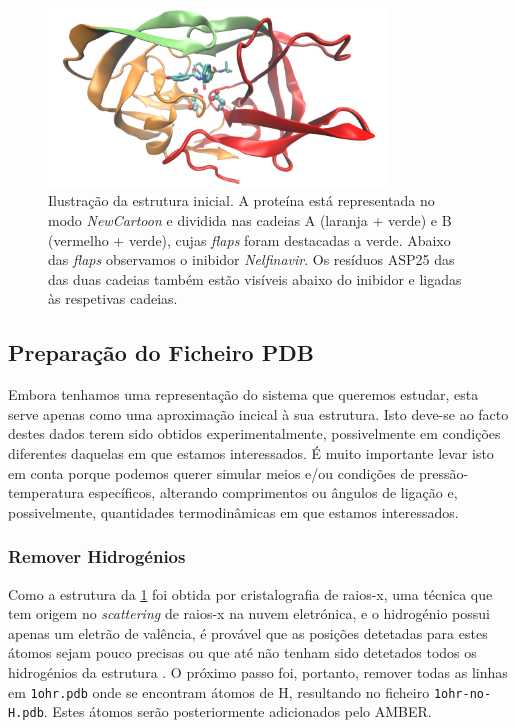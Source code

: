 \documentclass[12pt,a4paper]{article}
\begin{document}
	\begin{figure}[h]
		\centering
		\includegraphics[width=0.8\textwidth]{images/1ohr-chains.pdf}
		\caption{Ilustração da estrutura inicial. A proteína está representada no modo \textit{NewCartoon} e dividida nas cadeias A (laranja + verde) e B (vermelho + verde), cujas \textit{flaps} foram destacadas a verde. Abaixo das \textit{flaps} observamos o inibidor \textit{Nelfinavir}. Os resíduos ASP25 das das duas cadeias também estão visíveis abaixo do inibidor e ligadas às respetivas cadeias.}
		\label{fig:vis:original-pdb}
	\end{figure}

\subsection{Preparação do Ficheiro PDB}

	Embora tenhamos uma representação do sistema que queremos estudar, esta serve apenas como uma aproximação incical à sua estrutura. Isto deve-se ao facto destes dados terem sido obtidos experimentalmente, possivelmente em condições diferentes daquelas em que estamos interessados. É muito importante levar isto em conta porque podemos querer simular meios e/ou condições de pressão-temperatura específicos, alterando comprimentos ou ângulos de ligação e, possivelmente, quantidades termodinâmicas em que estamos interessados.
	
\subsubsection{Remover Hidrogénios}
	Como a estrutura da \cref{fig:vis:original-pdb} foi obtida por cristalografia de raios-x, uma técnica que tem origem no \textit{scattering} de raios-x na nuvem eletrónica, e o hidrogénio possui apenas um eletrão de valência, é provável que as posições detetadas para estes átomos sejam pouco precisas ou que até não tenham sido detetados todos os hidrogénios da estrutura \cite{woinskaHydrogenAtomsCan2016}. O próximo passo foi, portanto, remover todas as linhas em \verb|1ohr.pdb| onde se encontram átomos de H, resultando no ficheiro \verb|1ohr-no-H.pdb|. Estes átomos serão posteriormente adicionados pelo AMBER.
\end{document}
